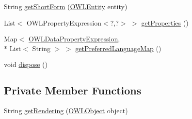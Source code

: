 \begin{DoxyCompactItemize}
\item 
String \hyperlink{classorg_1_1semanticweb_1_1owlapi_1_1util_1_1_property_assertion_value_short_form_provider_ad04c5a5a80d388e5c6f032301e256a3e}{get\-Short\-Form} (\hyperlink{interfaceorg_1_1semanticweb_1_1owlapi_1_1model_1_1_o_w_l_entity}{O\-W\-L\-Entity} entity)
\item 
List$<$ O\-W\-L\-Property\-Expression$<$?,?$>$ $>$ \hyperlink{classorg_1_1semanticweb_1_1owlapi_1_1util_1_1_property_assertion_value_short_form_provider_a1a3476d08abbe97cc54df5ae1cfd214f}{get\-Properties} ()
\item 
Map$<$ \hyperlink{interfaceorg_1_1semanticweb_1_1owlapi_1_1model_1_1_o_w_l_data_property_expression}{O\-W\-L\-Data\-Property\-Expression}, \\*
List$<$ String $>$ $>$ \hyperlink{classorg_1_1semanticweb_1_1owlapi_1_1util_1_1_property_assertion_value_short_form_provider_a466e2bb61e5f7e6eeb924a258b99c7cb}{get\-Preferred\-Language\-Map} ()
\item 
void \hyperlink{classorg_1_1semanticweb_1_1owlapi_1_1util_1_1_property_assertion_value_short_form_provider_ae34181cf2e356391a19baf5b2714d67d}{dispose} ()
\end{DoxyCompactItemize}
\subsection*{Private Member Functions}
\begin{DoxyCompactItemize}
\item 
String \hyperlink{classorg_1_1semanticweb_1_1owlapi_1_1util_1_1_property_assertion_value_short_form_provider_af5942c2e8e2ef670764b643c1183d79e}{get\-Rendering} (\hyperlink{interfaceorg_1_1semanticweb_1_1owlapi_1_1model_1_1_o_w_l_object}{O\-W\-L\-Object} object)
\end{DoxyCompactItemize}
